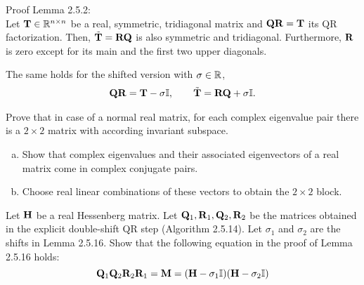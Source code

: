 
\begin{Sheet}
  \label{sheet6}
  
    \begin{Problem}
    Proof Lemma 2.5.2:\\
    Let $\mathbf T\in\mathbb R^{n\times n}$ be a real, symmetric, tridiagonal matrix and
    $\mathbf Q\mathbf R=\mathbf T$ its QR factorization. Then, $\tilde{\mathbf T}=\mathbf R\mathbf Q$ is also
    symmetric and tridiagonal. Furthermore, $\mathbf R$ is zero except for
    its main and the first two upper diagonals.
    
    The same holds for the shifted version with $\sigma\in\mathbb R$,
    \begin{gather*}
    \mathbf Q\mathbf R = \mathbf T-\sigma\mathbb I,\qquad \tilde{\mathbf T} = \mathbf R\mathbf Q+\sigma\mathbb I.
    \end{gather*}
  \end{Problem}

   \begin{Problem}
    Prove that in case of a normal real matrix, for each complex
    eigenvalue pair there is a $2\times 2$ matrix with according
    invariant subspace.
    \begin{enumerate}[(a)]
    \item Show that complex eigenvalues and their associated
        eigenvectors of a real matrix come in complex conjugate
        pairs.
    \item Choose real linear combinations of these vectors to obtain
      the $2\times 2$ block.
    \end{enumerate}
  \end{Problem}
  
    \begin{Problem}
    Let $\mathbf H$ be a real Hessenberg matrix. 
    Let $\mathbf Q_1,\mathbf R_1,\mathbf Q_2,\mathbf R_2$ be the matrices obtained in the explicit double-shift QR step (Algorithm 2.5.14).
    Let $\sigma_1$ and $\sigma_2$ are the shifts in Lemma 2.5.16.
    Show that the following equation in the proof of Lemma 2.5.16 holds:
    \begin{equation*}
	    \mathbf Q_1\mathbf Q_2\mathbf R_2\mathbf R_1 = \mathbf M = (\mathbf H - \sigma_1\mathbb I)(\mathbf H - \sigma_2\mathbb I)
    \end{equation*}
    
  \end{Problem}


\end{Sheet}
